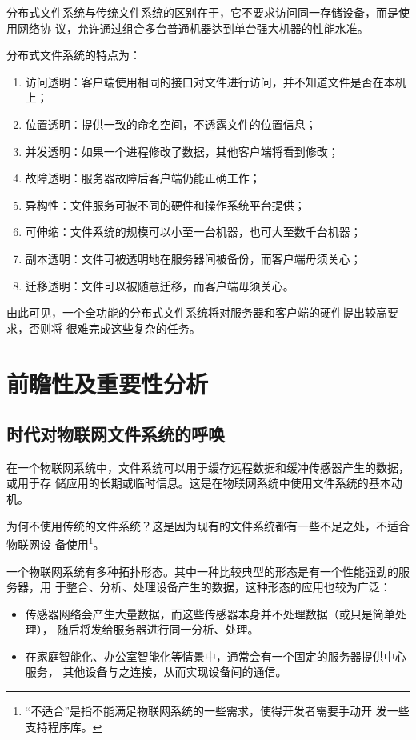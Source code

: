 \documentclass{ctexart}
\begin{document}
分布式文件系统与传统文件系统的区别在于，它不要求访问同一存储设备，而是使用网络协
议，允许通过组合多台普通机器达到单台强大机器的性能水准。

分布式文件系统的特点为：
\begin{enumerate}
\item 访问透明：客户端使用相同的接口对文件进行访问，并不知道文件是否在本机上；
\item 位置透明：提供一致的命名空间，不透露文件的位置信息；
\item 并发透明：如果一个进程修改了数据，其他客户端将看到修改；
\item 故障透明：服务器故障后客户端仍能正确工作；
\item 异构性：文件服务可被不同的硬件和操作系统平台提供；
\item 可伸缩：文件系统的规模可以小至一台机器，也可大至数千台机器；
\item 副本透明：文件可被透明地在服务器间被备份，而客户端毋须关心；
\item 迁移透明：文件可以被随意迁移，而客户端毋须关心。
\end{enumerate}

由此可见，一个全功能的分布式文件系统将对服务器和客户端的硬件提出较高要求，否则将
很难完成这些复杂的任务。

\section{前瞻性及重要性分析}

\subsection{时代对物联网文件系统的呼唤}

在一个物联网系统中，文件系统可以用于缓存远程数据和缓冲传感器产生的数据，或用于存
储应用的长期或临时信息。这是在物联网系统中使用文件系统的基本动机。

为何不使用传统的文件系统？这是因为现有的文件系统都有一些不足之处，不适合物联网设
备使用\footnote{“不适合”是指不能满足物联网系统的一些需求，使得开发者需要手动开
  发一些支持程序库。}。

一个物联网系统有多种拓扑形态。其中一种比较典型的形态是有一个性能强劲的服务器，用
于整合、分析、处理设备产生的数据，这种形态的应用也较为广泛：
\begin{itemize}
\item 传感器网络会产生大量数据，而这些传感器本身并不处理数据（或只是简单处理），
  随后将发给服务器进行同一分析、处理。
\item 在家庭智能化、办公室智能化等情景中，通常会有一个固定的服务器提供中心服务，
  其他设备与之连接，从而实现设备间的通信。
\end{itemize}
\end{document}
